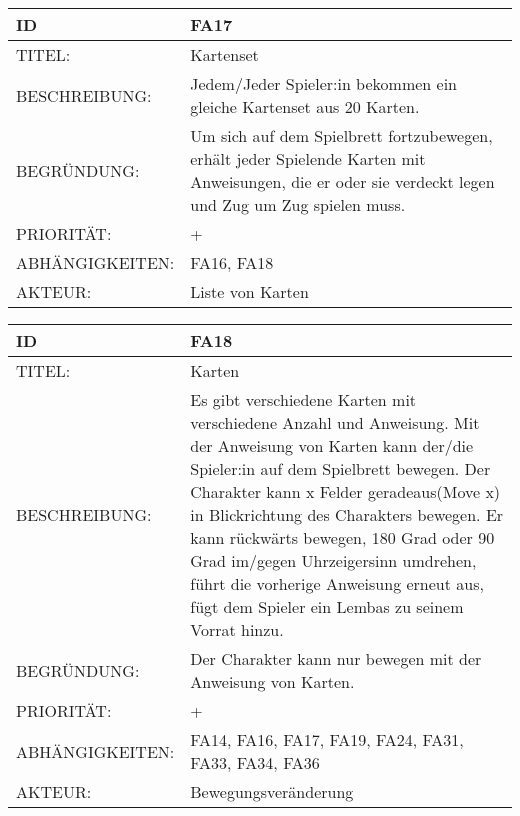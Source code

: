 \documentclass{uulm-assignment}
\begin{document}
    \begin{tabularx}{\textwidth}{|l|X |} \hline
        \textbf{ID} & \textbf{FA17} \\
        \hline
        TITEL: &  Kartenset\\
        \hline
        BESCHREIBUNG: & Jedem/Jeder Spieler:in bekommen ein gleiche Kartenset aus 20 Karten.
        \\
        \hline
        BEGRÜNDUNG: & Um sich auf dem Spielbrett fortzubewegen, erhält jeder Spielende Karten mit Anweisungen, die er oder sie verdeckt legen und Zug um Zug spielen muss.\\
        \hline
        PRIORITÄT: & +\\
        \hline
        ABHÄNGIGKEITEN: & FA16, FA18\\
        \hline
        AKTEUR: & Liste von Karten\\
        \hline
    \end{tabularx}
    
    \begin{tabularx}{\textwidth}{|l|X |} \hline
        \textbf{ID} & \textbf{FA18} \\
        \hline
        TITEL: &  Karten\\
        \hline
        BESCHREIBUNG: &  Es gibt verschiedene Karten mit verschiedene Anzahl und Anweisung. Mit der Anweisung von Karten kann der/die Spieler:in auf dem Spielbrett bewegen. Der Charakter kann x Felder geradeaus(Move x) in Blickrichtung des Charakters bewegen. Er kann rückwärts bewegen, 180 Grad oder 90 Grad im/gegen Uhrzeigersinn umdrehen, führt die vorherige Anweisung erneut aus, fügt dem Spieler ein Lembas zu seinem Vorrat hinzu.
        \\
        \hline
        BEGRÜNDUNG: & Der Charakter kann nur bewegen mit der Anweisung von Karten.\\
        \hline
        PRIORITÄT: & +\\
        \hline
        ABHÄNGIGKEITEN: & FA14, FA16, FA17, FA19, FA24, FA31, FA33, FA34, FA36\\
        \hline
        AKTEUR: & Bewegungsveränderung\\
        \hline
    \end{tabularx}
    
\end{document}
